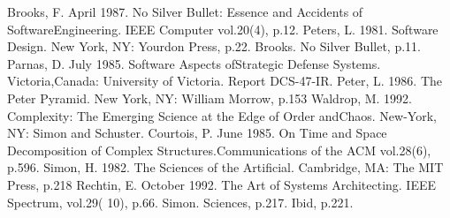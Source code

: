 \documentclass[11pt]{article}
\begin{document}
\begin{thebibliography}{99}
 Brooks, F. April 1987. No Silver Bullet: Essence and Accidents of Software\linebreak Engineering. IEEE Computer vol.20(4), p.12. 
Peters, L. 1981. Software Design. New York, NY: Yourdon Press, p.22. 
Brooks. No Silver Bullet, p.11. 
Parnas, D. July 1985. Software Aspects ofStrategic Defense Systems. Victoria,\linebreak Canada: University of Victoria. Report DCS-47-IR.
Peter, L. 1986. The Peter Pyramid. New York, NY: William Morrow, p.153
Waldrop, M. 1992. Complexity: The Emerging Science at the Edge of Order and\linebreak Chaos. New-York, NY: Simon and Schuster. 
Courtois, P. June 1985. On Time and Space Decomposition of Complex Structures.\linebreak Communications of the ACM vol.28(6), p.596. 
Simon, H. 1982. The Sciences of the Artificial. Cambridge, MA: The MIT Press, p.218
Rechtin, E. October 1992. The Art of Systems Architecting. IEEE Spectrum, vol.29( 10), p.66.
Simon. Sciences, p.217. 
Ibid, p.221.
\end{thebibliography}
\end{document}
